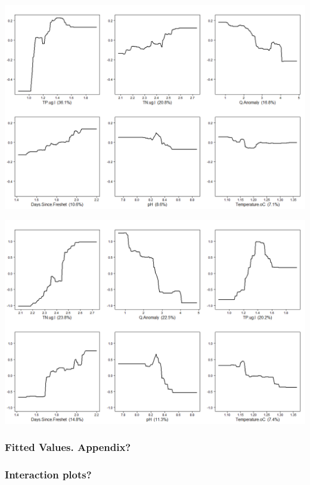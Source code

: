 \documentclass[
]{article}
\let\origfigure\figure
\let\endorigfigure\endfigure
\renewenvironment{figure}[1][2] {
    \expandafter\origfigure\expandafter[H]
} {
    \endorigfigure
}
\begin{document}
\begin{figure}
\includegraphics[width=1\linewidth]{Manuscript_files/FIGURES/Part_Dep_SS} \caption{A caption}\label{fig:unnamed-chunk-4}
\end{figure}

\begin{figure}
\includegraphics[width=1\linewidth]{Manuscript_files/FIGURES/Part_Dep_BNB} \caption{A caption}\label{fig:unnamed-chunk-5}
\end{figure}

\hypertarget{fitted-values.-appendix}{%
\subsubsection{Fitted Values. Appendix?}\label{fitted-values.-appendix}}

\hypertarget{interaction-plots}{%
\subsubsection{Interaction plots?}\label{interaction-plots}}
\end{document}

